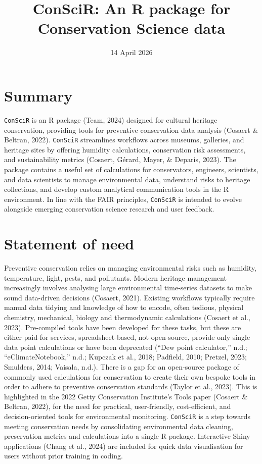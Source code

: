 \documentclass[
]{article}
\title{ConSciR: An R package for Conservation Science data}
\author{}
\date{\vspace{-2.5em}14 April 2026}
\begin{document}
\maketitle

\section{Summary}\label{summary}

\texttt{ConSciR} is an R package (Team, 2024) designed for cultural
heritage conservation, providing tools for preventive conservation data
analysis (Cosaert \& Beltran, 2022). \texttt{ConSciR} streamlines
workflows across museums, galleries, and heritage sites by offering
humidity calculations, conservation risk assessments, and sustainability
metrics (Cosaert, Gérard, Mayer, \& Deparis, 2023). The package contains
a useful set of calculations for conservators, engineers, scientists,
and data scientists to manage environmental data, understand risks to
heritage collections, and develop custom analytical communication tools
in the R environment. In line with the FAIR principles, \texttt{ConSciR}
is intended to evolve alongside emerging conservation science research
and user feedback.

\section{Statement of need}\label{statement-of-need}

Preventive conservation relies on managing environmental risks such as
humidity, temperature, light, pests, and pollutants. Modern heritage
management increasingly involves analysing large environmental
time-series datasets to make sound data-driven decisions (Cosaert,
2021). Existing workflows typically require manual data tidying and
knowledge of how to encode, often tedious, physical chemistry,
mechanical, biology and thermodynamic calculations (Cosaert et al.,
2023). Pre-compiled tools have been developed for these tasks, but these
are either paid-for services, spreadsheet-based, not open-source,
provide only single data point calculations or have been deprecated
({``Dew point calculator,''} n.d.; {``eClimateNotebook,''} n.d.; Kupczak
et al., 2018; Padfield, 2010; Pretzel, 2023; Smulders, 2014; Vaisala,
n.d.). There is a gap for an open-source package of commonly used
calculations for conservation to create their own bespoke tools in order
to adhere to preventive conservation standards (Taylor et al., 2023).
This is highlighted in the 2022 Getty Conservation Institute's Tools
paper (Cosaert \& Beltran, 2022), for the need for practical,
user-friendly, cost-efficient, and decision-oriented tools for
environmental monitoring. \texttt{ConSciR} is a step towards meeting
conservation needs by consolidating environmental data cleaning,
preservation metrics and calculations into a single R package.
Interactive Shiny applications (Chang et al., 2024) are included for
quick data visualisation for users without prior training in coding.
\end{document}
